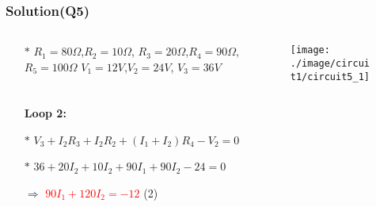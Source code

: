 \documentclass{beamer}
\newcommand{\red}[1]{\textcolor{red}{#1}}
\begin{document}

\begin{frame}
\frametitle{Solution(Q5)}
\begin{columns}
\begin{column}{5cm}
\begin{itemize} \itemsep1pt \parskip0pt 
  \item[$\ast$]  $R_1 = 80\Omega$,$R_2 = 10\Omega$,\newline
  $R_3 = 20\Omega$,$R_4 = 90\Omega$,\newline
  $R_5 = 100\Omega$ \newline
  $V_1 = 12V$,$V_2 = 24V$,\newline
  $V_3 = 36V$
\end{itemize}
\end{column}



\begin{column}{8cm}
\begin{figure}[H]
  \centering
  \texttt{[image: ./image/circuit1/circuit5\_1]}
\end{figure}
\end{column}
\end{columns}

\begin{itemize} \itemsep1pt \parskip0pt 
  \item[] {\bf Loop 2:}
  \item[$\ast$] $V_3 + I_2R_3 + I_2R_2 + (I_1 + I_2)R_4 -V_2 = 0$
  \item[$\ast$] $36 + 20I_2 + 10I_2 + 90I_1 + 90I_2- 24 = 0$
  \item[$\Rightarrow$] \red{$90I_1 + 120I_2 = -12$} \hspace{8 mm}(2)
\end{itemize}

\end{frame}

\end{document}
